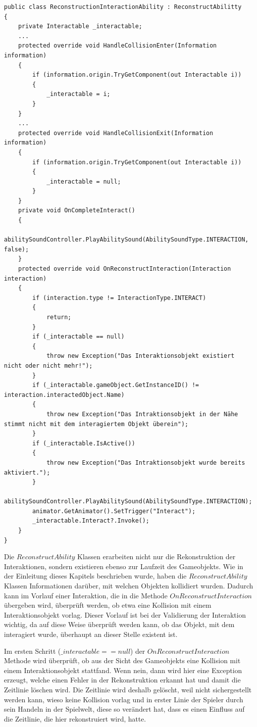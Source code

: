 \begin{lstlisting}[caption={Ausschnitt aus ReconstructionInteractionAbility.cs}, label={lst:reconstruction-interaction-ability}]
public class ReconstructionInteractionAbility : ReconstructAbilitty
{
    private Interactable _interactable;
    ...
    protected override void HandleCollisionEnter(Information information)
    {
        if (information.origin.TryGetComponent(out Interactable i))
        {
            _interactable = i;
        }
    }
    ...
    protected override void HandleCollisionExit(Information information)
    {
        if (information.origin.TryGetComponent(out Interactable i))
        {
            _interactable = null;
        }
    }
    private void OnCompleteInteract()
    {
        abilitySoundController.PlayAbilitySound(AbilitySoundType.INTERACTION, false);
    }
    protected override void OnReconstructInteraction(Interaction interaction)
    {
        if (interaction.type != InteractionType.INTERACT)
        {
            return;
        }
        if (_interactable == null)
        {
            throw new Exception("Das Interaktionsobjekt existiert nicht oder nicht mehr!");
        }
        if (_interactable.gameObject.GetInstanceID() != interaction.interactedObject.Name)
        {
            throw new Exception("Das Intraktionsobjekt in der Nähe stimmt nicht mit dem interagiertem Objekt überein");
        }
        if (_interactable.IsActive())
        {
            throw new Exception("Das Intraktionsobjekt wurde bereits aktiviert.");
        }
        abilitySoundController.PlayAbilitySound(AbilitySoundType.INTERACTION);
        animator.GetAnimator().SetTrigger("Interact");
        _interactable.Interact?.Invoke();
    }
}
\end{lstlisting}

Die $ReconstructAbility$ Klassen erarbeiten nicht nur die Rekonstruktion der Interaktionen, sondern existieren ebenso zur Laufzeit des Gameobjekts. Wie in der Einleitung dieses Kapitels beschrieben wurde, haben die $ReconstructAbility$ Klassen Informationen darüber, mit welchen Objekten kollidiert wurden. Dadurch kann im Vorlauf einer Interaktion, die in die Methode $OnReconstructInteraction$ übergeben wird, überprüft werden, ob etwa eine Kollision mit einem Interaktionsobjekt vorlag. Dieser Vorlauf ist bei der Validierung der Interaktion wichtig, da auf diese Weise überprüft werden kann, ob das Objekt, mit dem interagiert wurde, überhaupt an dieser Stelle existent ist. 

Im ersten Schritt ($\_interactable == null$) der $OnReconstructInteraction$ Methode wird überprüft, ob aus der Sicht des Gameobjekts eine Kollision mit einem Interaktionsobjekt stattfand. Wenn nein, dann wird hier eine Exception erzeugt, welche einen Fehler in der Rekonstruktion erkannt hat und damit die Zeitlinie löschen wird. Die Zeitlinie wird deshalb gelöscht, weil nicht sichergestellt werden kann, wieso keine Kollision vorlag und in erster Linie der Spieler durch sein Handeln in der Spielwelt, diese so verändert hat, dass es einen Einfluss auf die Zeitlinie, die hier rekonstruiert wird, hatte.

